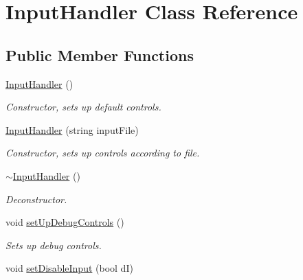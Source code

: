 \hypertarget{class_input_handler}{\section{Input\+Handler Class Reference}
\label{class_input_handler}
}
\subsection*{Public Member Functions}
\begin{DoxyCompactItemize}
\item 
\hypertarget{class_input_handler_a698aa4af4f326a9881835fda251ca996}{\hyperlink{class_input_handler_a698aa4af4f326a9881835fda251ca996}{Input\+Handler} ()}\label{class_input_handler_a698aa4af4f326a9881835fda251ca996}

\begin{DoxyCompactList}\small\item\em Constructor, sets up default controls. \end{DoxyCompactList}\item 
\hypertarget{class_input_handler_a5f4d9f7ba9a8a9c02f5fdef3e8fe79c8}{\hyperlink{class_input_handler_a5f4d9f7ba9a8a9c02f5fdef3e8fe79c8}{Input\+Handler} (string input\+File)}\label{class_input_handler_a5f4d9f7ba9a8a9c02f5fdef3e8fe79c8}

\begin{DoxyCompactList}\small\item\em Constructor, sets up controls according to file. \end{DoxyCompactList}\item 
\hypertarget{class_input_handler_ac1f7efb54b34d433d6ffba62627452b6}{\hyperlink{class_input_handler_ac1f7efb54b34d433d6ffba62627452b6}{$\sim$\+Input\+Handler} ()}\label{class_input_handler_ac1f7efb54b34d433d6ffba62627452b6}

\begin{DoxyCompactList}\small\item\em Deconstructor. \end{DoxyCompactList}\item 
\hypertarget{class_input_handler_ab3359d443715abc1968a354a91796fde}{void \hyperlink{class_input_handler_ab3359d443715abc1968a354a91796fde}{set\+Up\+Debug\+Controls} ()}\label{class_input_handler_ab3359d443715abc1968a354a91796fde}

\begin{DoxyCompactList}\small\item\em Sets up debug controls. \end{DoxyCompactList}\item 
\hypertarget{class_input_handler_a163702711e7b2fac8ee03a50499cde36}{void \hyperlink{class_input_handler_a163702711e7b2fac8ee03a50499cde36}{set\+Disable\+Input} (bool d\+I)}\label{class_input_handler_a163702711e7b2fac8ee03a50499cde36}


\end{DoxyCompactItemize}
